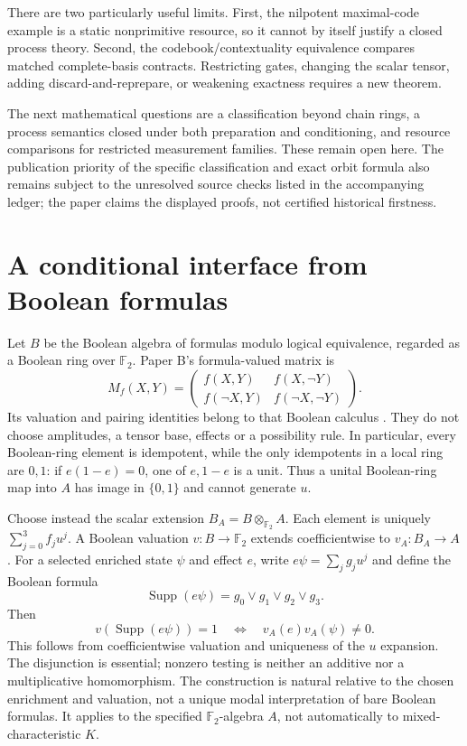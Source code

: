 \documentclass[11pt]{article}
\theoremstyle{definition}\newtheorem{definition}[theorem]{Definition}
\theoremstyle{remark}\newtheorem{remark}[theorem]{Remark}
\newcommand{\F}{\mathbb F}
\begin{document}
There are two particularly useful limits. First, the nilpotent maximal-code example is a static nonprimitive resource, so it cannot by itself justify a closed process theory. Second, the codebook/contextuality equivalence compares matched complete-basis contracts. Restricting gates, changing the scalar tensor, adding discard-and-reprepare, or weakening exactness requires a new theorem.

The next mathematical questions are a classification beyond chain rings, a process semantics closed under both preparation and conditioning, and resource comparisons for restricted measurement families. These remain open here. The publication priority of the specific classification and exact orbit formula also remains subject to the unresolved source checks listed in the accompanying ledger; the paper claims the displayed proofs, not certified historical firstness.

\appendix
\section{A conditional interface from Boolean formulas}\label{app:lm}
Let $B$ be the Boolean algebra of formulas modulo logical equivalence, regarded as a Boolean ring over $\F_2$. Paper B's formula-valued matrix is
\[
 M_f(X,Y)=\begin{pmatrix}f(X,Y)&f(X,\neg Y)\\f(\neg X,Y)&f(\neg X,\neg Y)\end{pmatrix}.
\]
Its valuation and pairing identities belong to that Boolean calculus \cite{PaperB}. They do not choose amplitudes, a tensor base, effects or a possibility rule. In particular, every Boolean-ring element is idempotent, while the only idempotents in a local ring are $0,1$: if $e(1-e)=0$, one of $e,1-e$ is a unit. Thus a unital Boolean-ring map into $A$ has image in $\{0,1\}$ and cannot generate $u$.

Choose instead the scalar extension $B_A=B\otimes_{\F_2}A$. Each element is uniquely $\sum_{j=0}^3 f_j u^j$. A Boolean valuation $v:B\to\F_2$ extends coefficientwise to $v_A:B_A\to A$. For a selected enriched state $\psi$ and effect $e$, write $e\psi=\sum_j g_j u^j$ and define the Boolean formula
\[
 \operatorname{Supp}(e\psi)=g_0\lor g_1\lor g_2\lor g_3.
\]
Then
\[
 v(\operatorname{Supp}(e\psi))=1
 \quad\Longleftrightarrow\quad v_A(e)v_A(\psi)\ne0.
\]
This follows from coefficientwise valuation and uniqueness of the $u$ expansion. The disjunction is essential; nonzero testing is neither an additive nor a multiplicative homomorphism. The construction is natural relative to the chosen enrichment and valuation, not a unique modal interpretation of bare Boolean formulas. It applies to the specified $\F_2$-algebra $A$, not automatically to mixed-characteristic $K$.
\end{document}
